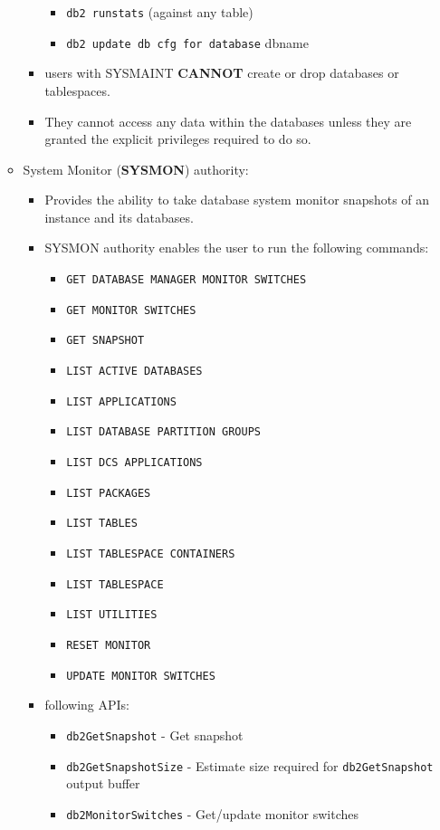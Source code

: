 \documentclass{article}
\begin{document}
\begin{itemize}
\begin{itemize}
\begin{itemize}
\begin{itemize}
		\item \texttt{db2 runstats} (against any table)
		\item \texttt{db2 update db cfg for database} dbname
		\end{itemize}
	\item users with SYSMAINT \textbf{CANNOT} create or drop databases or tablespaces.
	\item They cannot access any data within the databases unless they are granted the explicit
	privileges required to do so.
	\end{itemize}
\item System Monitor (\textbf{SYSMON}) authority:
	\begin{itemize}
	\item Provides the ability to take database system monitor snapshots of an instance and its databases.
	\item SYSMON authority enables the user to run the following commands:
		\begin{itemize}
		\item \texttt{GET DATABASE MANAGER MONITOR SWITCHES}
		\item \texttt{GET MONITOR SWITCHES}
		\item \texttt{GET SNAPSHOT}
		\item \texttt{LIST ACTIVE DATABASES}
		\item \texttt{LIST APPLICATIONS}
		\item \texttt{LIST DATABASE PARTITION GROUPS}
		\item \texttt{LIST DCS APPLICATIONS}
		\item \texttt{LIST PACKAGES}
		\item \texttt{LIST TABLES}
		\item \texttt{LIST TABLESPACE CONTAINERS}
		\item \texttt{LIST TABLESPACE}
		\item \texttt{LIST UTILITIES}
		\item \texttt{RESET MONITOR}
		\item \texttt{UPDATE MONITOR SWITCHES}
		\end{itemize}
	\item following APIs:
		\begin{itemize}
		\item \texttt{db2GetSnapshot} - Get snapshot
		\item \texttt{db2GetSnapshotSize} - Estimate size required for \texttt{db2GetSnapshot} output
		buffer
		\item \texttt{db2MonitorSwitches} - Get/update monitor switches

\end{itemize}
\end{itemize}
\end{itemize}
\end{itemize}
\end{document}
